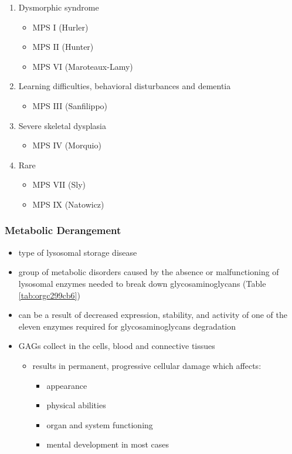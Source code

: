\documentclass[12pt]{scrartcl}
\begin{document}
\begin{enumerate}
\item Dysmorphic syndrome
\label{sec:org5552916}
\begin{itemize}
\item MPS I (Hurler)
\item MPS II (Hunter)
\item MPS VI (Maroteaux-Lamy)
\end{itemize}
\item Learning difficulties, behavioral disturbances and dementia
\label{sec:orgc588b80}
\begin{itemize}
\item MPS III (Sanfilippo)
\end{itemize}
\item Severe skeletal dysplasia
\label{sec:org0150c58}
\begin{itemize}
\item MPS IV (Morquio)
\end{itemize}
\item Rare
\label{sec:org7f66230}
\begin{itemize}
\item MPS VII (Sly)
\item MPS IX (Natowicz)
\end{itemize}
\end{enumerate}

\subsubsection{Metabolic Derangement}
\label{sec:org5bd0780}
\begin{itemize}
\item type of lysosomal storage disease
\item group of metabolic disorders caused by the absence or malfunctioning
of lysosomal enzymes needed to break down glycosaminoglycans (Table \ref{tab:orgc299cb6})
\item can be a result of decreased expression, stability, and activity of
one of the eleven enzymes required for glycosaminoglycans
degradation
\item GAGs collect in the cells, blood and connective tissues
\begin{itemize}
\item results in permanent, progressive cellular damage which affects:
\begin{itemize}
\item appearance
\item physical abilities
\item organ and system functioning
\item mental development in most cases
\end{itemize}
\end{itemize}
\end{itemize}
\end{document}
